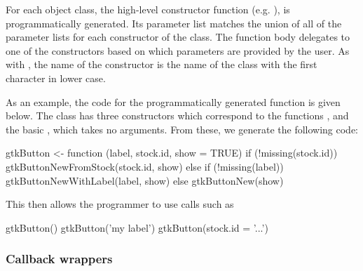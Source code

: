 \documentclass[article,shortnames]{jss}
\begin{document}
For each object class, the high-level constructor function (e.g.
), is programmatically generated. Its parameter list
matches the union of all of the parameter lists for each constructor
of the class. The function body delegates to one of the constructors
based on which parameters are provided by the user. As with
, the name of the constructor is the name
of the class with the first character in lower case. 

As an example, the code for the programmatically generated
 function is given below.  The 
class has three constructors which correspond to the functions
,
 and the basic ,
which takes no arguments. From these, we generate the following code:
\begin{Code}
gtkButton <- function (label, stock.id, show = TRUE) 
{
    if (!missing(stock.id)) {
        gtkButtonNewFromStock(stock.id, show)
    }
    else {
        if (!missing(label)) {
            gtkButtonNewWithLabel(label, show)
        }
        else {
            gtkButtonNew(show)
        }
    }
}
\end{Code}
This then allows the  programmer to use calls such as
\begin{Code}
gtkButton()
gtkButton('my label')
gtkButton(stock.id = '...')
\end{Code}

\subsubsection{Callback wrappers}
%

\end{document}
